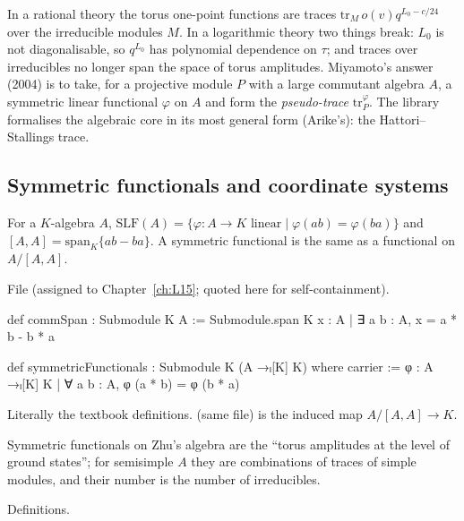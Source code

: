 In a rational theory the torus one-point functions are traces $\mathrm{tr}_M\,o(v)q^{L_0-c/24}$ over the irreducible
modules $M$. In a logarithmic theory two things break: $L_0$ is not diagonalisable, so $q^{L_0}$ has polynomial
dependence on $\tau$; and traces over irreducibles no longer span the space of torus amplitudes. Miyamoto's
answer (2004) is to take, for a projective module $P$ with a large commutant algebra $A$, a symmetric linear
functional $\varphi$ on $A$ and form the \emph{pseudo-trace} $\mathrm{tr}^\varphi_P$. The library formalises the
algebraic core in its most general form (Arike's): the Hattori--Stallings trace.

\subsection{Symmetric functionals and coordinate systems}

\begin{definition}\label{l18:def:slf}
For a $K$-algebra $A$, $\mathrm{SLF}(A)=\{\varphi:A\to K\text{ linear}\mid\varphi(ab)=\varphi(ba)\}$ and
$[A,A]=\mathrm{span}_K\{ab-ba\}$. A symmetric functional is the same as a functional on $A/[A,A]$.
\end{definition}
\noindent File  (assigned to Chapter~\ref{ch:L15};
quoted here for self-containment).
\begin{leancode}
def commSpan : Submodule K A := Submodule.span K {x : A | ∃ a b : A, x = a * b - b * a}

def symmetricFunctionals : Submodule K (A →ₗ[K] K) where
  carrier := {φ : A →ₗ[K] K | ∀ a b : A, φ (a * b) = φ (b * a)}
\end{leancode}
\begin{dictionary}
Literally the textbook definitions.  (same file) is the induced map $A/[A,A]\to K$.
\end{dictionary}
\begin{physics}
Symmetric functionals on Zhu's algebra are the ``torus amplitudes at the level of ground states''; for semisimple
$A$ they are combinations of traces of simple modules, and their number is the number of irreducibles.
\end{physics}
\begin{status}
Definitions.
\end{status}

